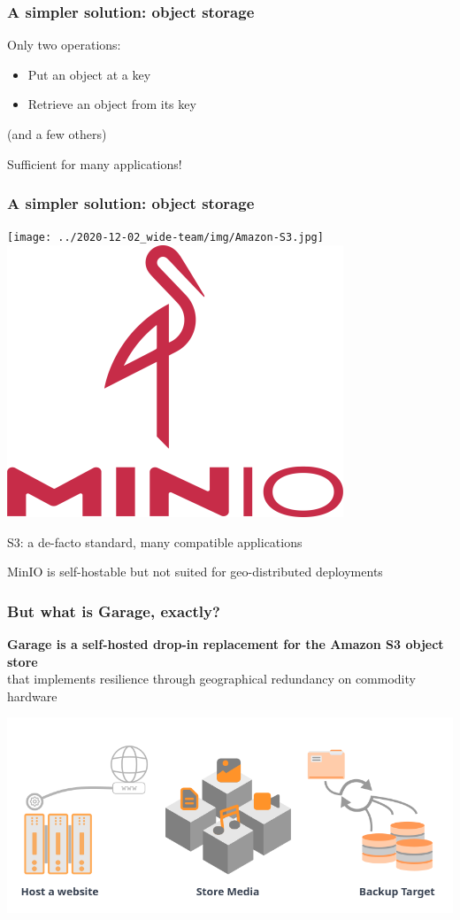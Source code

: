 \documentclass[aspectratio=169]{beamer}
\begin{document}
\begin{frame}
	\frametitle{A simpler solution: object storage}
	Only two operations:
	\vspace{1em}
	\begin{itemize}
		\item Put an object at a key
			\vspace{1em}
		\item Retrieve an object from its key
	\end{itemize}
	\vspace{1em}
	{\footnotesize (and a few others)}

	\vspace{1em}
	Sufficient for many applications!
\end{frame}

\begin{frame}
	\frametitle{A simpler solution: object storage}
		\begin{center}
			\texttt{[image: ../2020-12-02\_wide-team/img/Amazon-S3.jpg]}
			\hspace{5em}
			\includegraphics[width=.2\linewidth]{assets/minio.png}
		\end{center}
		\vspace{1em}
	S3: a de-facto standard, many compatible applications

	\vspace{1em}

	MinIO is self-hostable but not suited for geo-distributed deployments
\end{frame}


\begin{frame}
	\frametitle{But what is Garage, exactly?}
	\textbf{Garage is a self-hosted drop-in replacement for the Amazon S3 object store}\\
	\vspace{.5em}
	that implements resilience through geographical redundancy on commodity hardware
		\begin{center}
			\includegraphics[width=.8\linewidth]{assets/garageuses.png}
		\end{center}
\end{frame}
\end{document}
